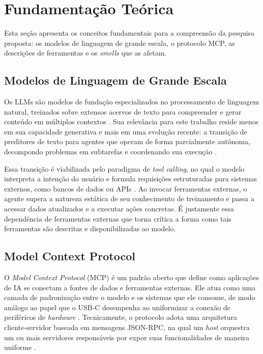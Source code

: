 \section{Fundamentação Teórica}
\label{sec:fundamentacao}

Esta seção apresenta os conceitos fundamentais para a compreensão da pesquisa proposta: os modelos de linguagem de grande escala, o protocolo MCP, as descrições de ferramentas e os \textit{smells} que as afetam.

\subsection{Modelos de Linguagem de Grande Escala}

Os LLMs são modelos de fundação especializados no processamento de linguagem natural, treinados sobre extensos acervos de texto para compreender e gerar conteúdo em múltiplos contextos \cite{2025arXiv250814704L}. Sua relevância para este trabalho reside menos em sua capacidade generativa e mais em uma evolução recente: a transição de preditores de texto para agentes que operam de forma parcialmente autônoma, decompondo problemas em subtarefas e coordenando sua execução \cite{multiagent}.

Essa transição é viabilizada pelo paradigma de \textit{tool calling}, no qual o modelo interpreta a intenção do usuário e formula requisições estruturadas para sistemas externos, como bancos de dados ou APIs \cite{11298840}. Ao invocar ferramentas externas, o agente supera a natureza estática de seu conhecimento de treinamento e passa a acessar dados atualizados e a executar ações concretas. É justamente essa dependência de ferramentas externas que torna crítica a forma como tais ferramentas são descritas e disponibilizadas ao modelo.

\subsection{Model Context Protocol}

O \textit{Model Context Protocol} (MCP) é um padrão aberto que define como aplicações de IA se conectam a fontes de dados e ferramentas externas. Ele atua como uma camada de padronização entre o modelo e os sistemas que ele consome, de modo análogo ao papel que o USB-C desempenha ao uniformizar a conexão de periféricos de \textit{hardware} \cite{guo2025measurement}. Tecnicamente, o protocolo adota uma arquitetura cliente-servidor baseada em mensagens JSON-RPC, na qual um \textit{host} orquestra um ou mais servidores responsáveis por expor suas funcionalidades de maneira uniforme \cite{shi2026description}.

